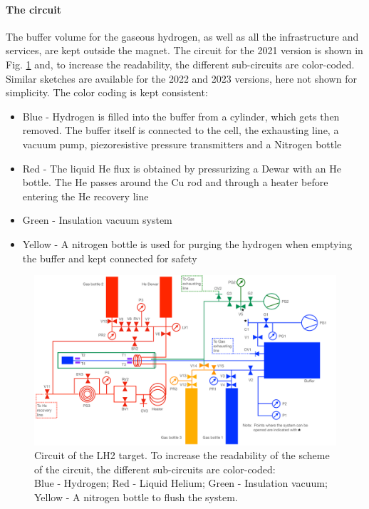 \begin{refsection}
    \paragraph{The circuit}
    The buffer volume for the gaseous hydrogen, as well as all the infrastructure and services, are kept outside the magnet. The circuit for the 2021 version is shown in Fig. \ref{fig:LH2:2021:circuit} and, to increase the readability, the different sub-circuits are color-coded. 
    Similar sketches are available for the 2022 and 2023 versions, here not shown for simplicity.
    The color coding is kept consistent:
    \begin{itemize}
        \item Blue - Hydrogen is filled into the buffer from a cylinder, which gets then removed.
        The buffer itself is connected to the cell, the exhausting line, a vacuum pump, piezoresistive pressure transmitters and a Nitrogen bottle
        \item Red - The liquid He flux is obtained by pressurizing a Dewar with an He bottle. 
        The He passes around the Cu rod and through a heater before entering the He recovery line
        \item Green - Insulation vacuum system
        \item Yellow - A nitrogen bottle is used for purging the hydrogen when emptying the buffer and kept connected for safety
    \end{itemize}
    

    \begin{figure}
        \centering
        \includegraphics[width=\textwidth]{Figures/LH2/2021/2021_LH2_circuit.png}
        \caption[CEX 2021: LH2 circuit.]{Circuit of the LH2 target. To increase the readability of the scheme of the circuit, the different sub-circuits are color-coded:\\ Blue - Hydrogen; Red - Liquid Helium; Green - Insulation vacuum; Yellow - A nitrogen bottle to flush the system.}
    \label{fig:LH2:2021:circuit}
    \end{figure}


\end{refsection}
